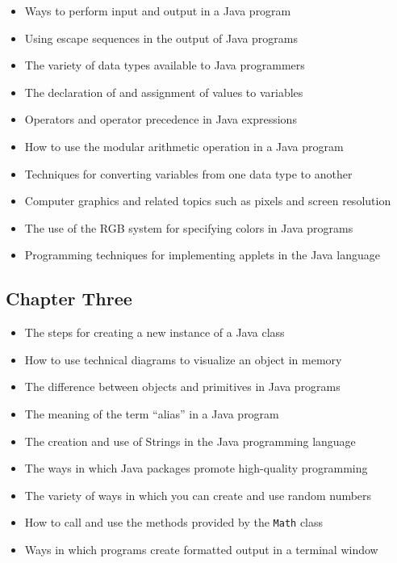 \begin{itemize}

  \itemsep -.015in
  \item Ways to perform input and output in a Java program
  \item Using escape sequences in the output of Java programs
  \item The variety of data types available to Java programmers
  \item The declaration of and assignment of values to variables
  \item Operators and operator precedence in Java expressions
  \item How to use the modular arithmetic operation in a Java program
  \item Techniques for converting variables from one data type to another
  \item Computer graphics and related topics such as pixels and screen resolution
  \item The use of the RGB system for specifying colors in Java programs
  \item Programming techniques for implementing applets in the Java language

\end{itemize}

\vspace*{-.25in}
\subsection*{Chapter Three}
\vspace*{-.1in}

\begin{itemize}

  \itemsep -.015in
  \item The steps for creating a new instance of a Java class
  \item How to use technical diagrams to visualize an object in memory
  \item The difference between objects and primitives in Java programs
  \item The meaning of the term ``alias'' in a Java program
  \item The creation and use of Strings in the Java programming language
  \item The ways in which Java packages promote high-quality programming
  \item The variety of ways in which you can create and use random numbers
  \item How to call and use the methods provided by the {\tt Math} class
  \item Ways in which programs create formatted output in a terminal window

\end{itemize}

